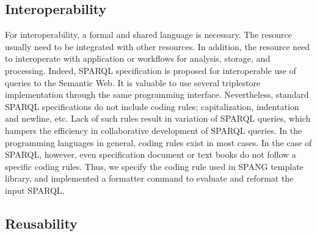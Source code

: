 \documentclass[runningheads]{llncs}
\begin{document}
\subsection{Interoperability}
For interoperability, a formal and shared language is necessary.
The resource usually need to be integrated with other resources. 
In addition, the resource need to interoperate with application or workflows for analysis, storage, and processing.
Indeed, SPARQL specification is proposed for interoperable use of queries to the Semantic Web. 
It is valuable to use several triplestore implementation through the same programming interface. 
Nevertheless, standard SPARQL specifications do not include coding rules; capitalization, indentation and newline, etc. 
Lack of such rules result in variation of SPARQL queries, which hampers the efficiency in collaborative development of SPARQL queries. 
In the programming languages in general, coding rules exist in most cases. 
In the case of SPARQL, however, even specification document or text books do not follow a specific coding rules. 
Thus, we specify the coding rule used in SPANG template library, and implemented a formatter command to evaluate and reformat the input SPARQL.

\subsection{Reusability}

\end{document}

